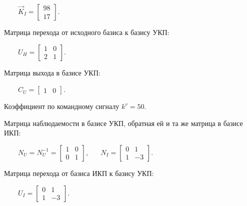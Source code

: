 \documentclass[a4paper]{article}
\begin{document}
{\begin{russian}\sffamily
\ \ \ \  $\vec K_I=\left[\begin{matrix}98\\17\end{matrix}\right]$.
\end{russian}}

{\begin{russian}\sffamily
Матрица перехода от исходного базиса к базису УКП:
\end{russian}}

{\begin{russian}\sffamily
\ \ \ \  $U_H=\left[\begin{matrix}1&0\\2&1\end{matrix}\right]$.
\end{russian}}

{\begin{russian}\sffamily
Матрица выхода в базисе УКП:
\end{russian}}

{\begin{russian}\sffamily
\ \ \ \  $C_U=\left[\begin{matrix}1&0\end{matrix}\right]$.
\end{russian}}

{\begin{russian}\sffamily
Коэффициент по командному сигналу  $k^v=50$.
\end{russian}}

{\begin{russian}\sffamily
Матрица наблюдаемости в базисе УКП, обратная ей и та же матрица в базисе ИКП:
\end{russian}}

{\begin{russian}\sffamily
\ \ \ \  $N_U=N_U^{-1}=\left[\begin{matrix}1&0\\0&1\end{matrix}\right]$, \ \ \ 
$N_I=\left[\begin{matrix}0&1\\1&-3\end{matrix}\right]$.
\end{russian}}

{\begin{russian}\sffamily
Матрица перехода от базиса ИКП к базису УКП:
\end{russian}}

{\begin{russian}\sffamily
\ \ \ \  $U_I=\left[\begin{matrix}0&1\\1&-3\end{matrix}\right]$.
\end{russian}}
\end{document}

